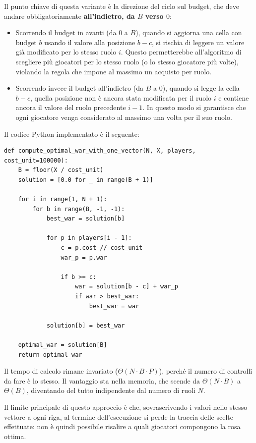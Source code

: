 Il punto chiave di questa variante è la direzione del ciclo sul budget, che deve andare obbligatoriamente \textbf{all'indietro, da $B$ verso $0$}:
\begin{itemize}
	\item Scorrendo il budget in avanti (da $0$ a $B$), quando si aggiorna una cella con budget $b$ usando il valore alla posizione $b - c$, si rischia di leggere un valore già modificato per lo stesso ruolo $i$. Questo permetterebbe all'algoritmo di scegliere più giocatori per lo stesso ruolo (o lo stesso giocatore più volte), violando la regola che impone al massimo un acquisto per ruolo.
	\item Scorrendo invece il budget all'indietro (da $B$ a $0$), quando si legge la cella $b - c$, quella posizione non è ancora stata modificata per il ruolo $i$ e contiene ancora il valore del ruolo precedente $i-1$. In questo modo si garantisce che ogni giocatore venga considerato al massimo una volta per il suo ruolo.
\end{itemize}

Il codice Python implementato è il seguente:

\begin{lstlisting}
def compute_optimal_war_with_one_vector(N, X, players, cost_unit=100000):
    B = floor(X / cost_unit)
    solution = [0.0 for _ in range(B + 1)]

    for i in range(1, N + 1):
        for b in range(B, -1, -1):
            best_war = solution[b]

            for p in players[i - 1]:
                c = p.cost // cost_unit
                war_p = p.war

                if b >= c:
                    war = solution[b - c] + war_p
                    if war > best_war:
                        best_war = war

            solution[b] = best_war

    optimal_war = solution[B]
    return optimal_war
\end{lstlisting}

Il tempo di calcolo rimane invariato ($\Theta(N \cdot B \cdot P)$), perché il numero di controlli da fare è lo stesso. Il vantaggio sta nella memoria, che scende da $\Theta(N \cdot B)$ a \textbf{$\Theta(B)$}, diventando del tutto indipendente dal numero di ruoli $N$.

Il limite principale di questo approccio è che, sovrascrivendo i valori nello stesso vettore a ogni riga, al termine dell'esecuzione si perde la traccia delle scelte effettuate: non è quindi possibile risalire a quali giocatori compongono la rosa ottima.

